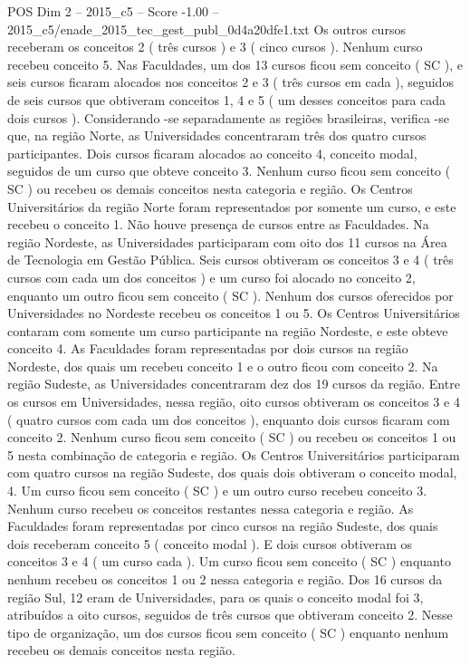 \begin{textsample}{POS Dim 2 – 2015\_c5 – Score -1.00 – 2015\_c5/enade\_2015\_tec\_gest\_publ\_0d4a20dfe1.txt}
Os outros cursos receberam os conceitos 2 ( três cursos ) e 3 ( cinco cursos ).
Nenhum curso recebeu conceito 5.
Nas Faculdades, um dos 13 cursos ficou sem conceito ( SC ), e seis cursos ficaram alocados nos conceitos 2 e 3 ( três cursos em cada ), seguidos de seis cursos que obtiveram conceitos 1, 4 e 5 ( um desses conceitos para cada dois cursos ).
Considerando -se separadamente as regiões brasileiras, verifica -se que, na região Norte, as Universidades concentraram três dos quatro cursos participantes.
Dois cursos ficaram alocados ao conceito 4, conceito modal, seguidos de um curso que obteve conceito 3.
Nenhum curso ficou sem conceito ( SC ) ou recebeu os demais conceitos nesta categoria e região.
Os Centros Universitários da região Norte foram representados por somente um curso, e este recebeu o conceito 1.
Não houve presença de cursos entre as Faculdades.
Na região Nordeste, as Universidades participaram com oito dos 11 cursos na Área de Tecnologia em Gestão Pública.
Seis cursos obtiveram os conceitos 3 e 4 ( três cursos com cada um dos conceitos ) e um curso foi alocado no conceito 2, enquanto um outro ficou sem conceito ( SC ).
Nenhum dos cursos oferecidos por Universidades no Nordeste recebeu os conceitos 1 ou 5.
Os Centros Universitários contaram com somente um curso participante na região Nordeste, e este obteve conceito 4.
As Faculdades foram representadas por dois cursos na região Nordeste, dos quais um recebeu conceito 1 e o outro ficou com conceito 2.
Na região Sudeste, as Universidades concentraram dez dos 19 cursos da região.
Entre os cursos em Universidades, nessa região, oito cursos obtiveram os conceitos 3 e 4 ( quatro cursos com cada um dos conceitos ), enquanto dois cursos ficaram com conceito 2.
Nenhum curso ficou sem conceito ( SC ) ou recebeu os conceitos 1 ou 5 nesta combinação de categoria e região.
Os Centros Universitários participaram com quatro cursos na região Sudeste, dos quais dois obtiveram o conceito modal, 4.
Um curso ficou sem conceito ( SC ) e um outro curso recebeu conceito 3.
Nenhum curso recebeu os conceitos restantes nessa categoria e região.
As Faculdades foram representadas por cinco cursos na região Sudeste, dos quais dois receberam conceito 5 ( conceito modal ).
E dois cursos obtiveram os conceitos 3 e 4 ( um curso cada ).
Um curso ficou sem conceito ( SC ) enquanto nenhum recebeu os conceitos 1 ou 2 nessa categoria e região.
Dos 16 cursos da região Sul, 12 eram de Universidades, para os quais o conceito modal foi 3, atribuídos a oito cursos, seguidos de três cursos que obtiveram conceito 2.
Nesse tipo de organização, um dos cursos ficou sem conceito ( SC ) enquanto nenhum recebeu os demais conceitos nesta região.

\end{textsample}
